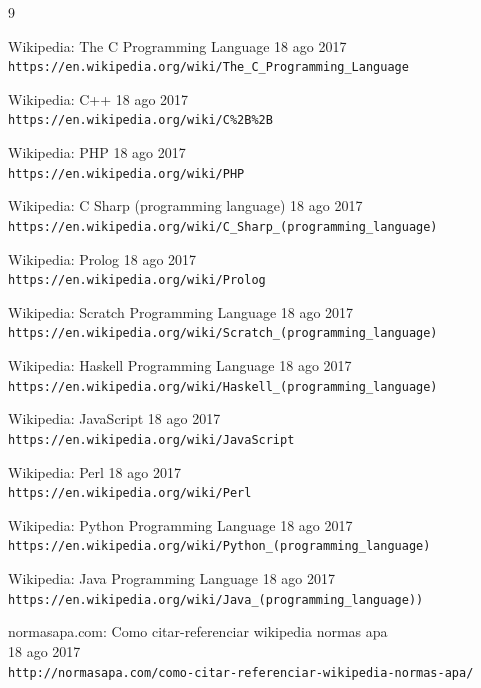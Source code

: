 \documentclass{article}
\begin{document}
\begin{thebibliography}{9}

Wikipedia: The C Programming Language   18 ago 2017
\\\texttt{https://en.wikipedia.org/wiki/The\_C\_Programming\_Language}


Wikipedia: C++   18 ago 2017
\\\texttt{https://en.wikipedia.org/wiki/C\%2B\%2B}

Wikipedia: PHP   18 ago 2017
\\\texttt{https://en.wikipedia.org/wiki/PHP}

Wikipedia: C Sharp (programming language)   18 ago 2017
\\\texttt{https://en.wikipedia.org/wiki/C\_Sharp\_(programming\_language)}

Wikipedia: Prolog   18 ago 2017
\\\texttt{https://en.wikipedia.org/wiki/Prolog}

Wikipedia: Scratch Programming Language   18 ago 2017
\\\texttt{https://en.wikipedia.org/wiki/Scratch\_(programming\_language)}

Wikipedia: Haskell Programming Language   18 ago 2017
\\\texttt{https://en.wikipedia.org/wiki/Haskell\_(programming\_language)}

Wikipedia: JavaScript   18 ago 2017
\\\texttt{https://en.wikipedia.org/wiki/JavaScript}

Wikipedia: Perl  18 ago 2017
\\\texttt{https://en.wikipedia.org/wiki/Perl}

Wikipedia: Python Programming Language   18 ago 2017
\\\texttt{https://en.wikipedia.org/wiki/Python\_(programming\_language)}

Wikipedia: Java Programming Language   18 ago 2017
\\\texttt{https://en.wikipedia.org/wiki/Java\_(programming\_language))}

normasapa.com: Como citar-referenciar wikipedia normas apa \\ 18 ago 2017
\\\texttt{http://normasapa.com/como-citar-referenciar-wikipedia-normas-apa/}




\end{thebibliography}
\end{document}
